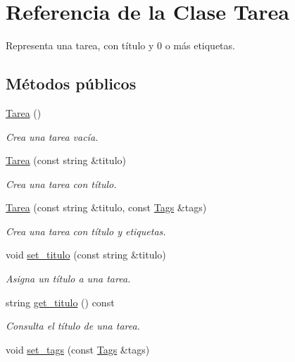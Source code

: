 \hypertarget{class_tarea}{\section{Referencia de la Clase Tarea}
\label{class_tarea}
}


Representa una tarea, con título y 0 o más etiquetas.  


\subsection*{Métodos públicos}
\begin{DoxyCompactItemize}
\item 
\hyperlink{class_tarea_afd1c4fcbd6fe22188e6f0dae6b44829b}{Tarea} ()
\begin{DoxyCompactList}\small\item\em Crea una tarea vacía. \end{DoxyCompactList}\item 
\hyperlink{class_tarea_abaa681784a3da14374a729fcfa68bd05}{Tarea} (const string \&titulo)
\begin{DoxyCompactList}\small\item\em Crea una tarea con título. \end{DoxyCompactList}\item 
\hyperlink{class_tarea_a1d62458f1415a8663f3138ca670488bb}{Tarea} (const string \&titulo, const \hyperlink{class_tags}{Tags} \&tags)
\begin{DoxyCompactList}\small\item\em Crea una tarea con título y etiquetas. \end{DoxyCompactList}\item 
void \hyperlink{class_tarea_aa9371098468f9074182b5df5dc240fc3}{set\-\_\-titulo} (const string \&titulo)
\begin{DoxyCompactList}\small\item\em Asigna un título a una tarea. \end{DoxyCompactList}\item 
string \hyperlink{class_tarea_a101c30f2185d0e69b7e3188fad33041f}{get\-\_\-titulo} () const 
\begin{DoxyCompactList}\small\item\em Consulta el título de una tarea. \end{DoxyCompactList}\item 
void \hyperlink{class_tarea_a70871ce092aceb665b59f2094520bba4}{set\-\_\-tags} (const \hyperlink{class_tags}{Tags} \&tags)

\end{DoxyCompactItemize}
